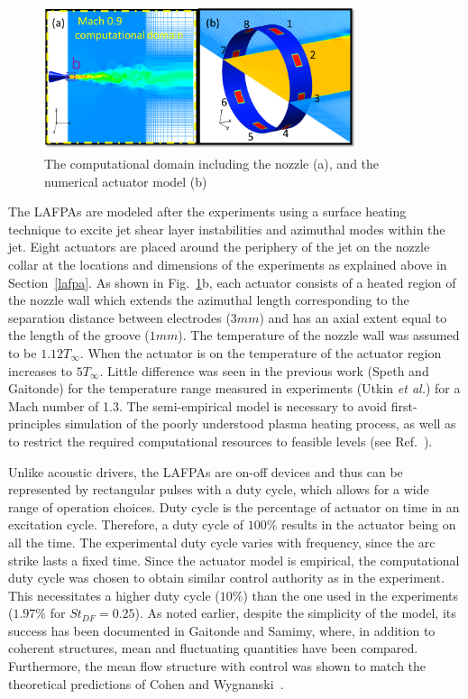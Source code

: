 \documentclass[english]{aiaa-tc}
\begin{document}
\begin{figure}[h]
\begin{center}
\includegraphics[width=3.6in]{actuatormodelnew}
\caption{The computational domain including the nozzle  (a), and the numerical actuator model (b)}\label{fig:actuator}
\end{center}
\end{figure}
The LAFPAs are modeled after the experiments using a surface heating
technique to excite jet shear layer instabilities and azimuthal modes
within the jet.  Eight actuators are placed around the periphery of
the jet on the nozzle collar at the locations and dimensions of the
experiments as explained above in Section~\ref{lafpa}. As shown in
Fig.~\ref{fig:actuator}b, each actuator consists of a heated region of
the nozzle wall which extends the azimuthal length corresponding to
the separation distance between electrodes ($3 mm$) and has an axial
extent equal to the length of the groove ($1 mm$). The temperature of
the nozzle wall was assumed to be $1.12T_{\infty}$.  When the actuator
is on the temperature of the actuator region increases to
$5T_{\infty}$. Little difference was seen in the previous work (Speth
and Gaitonde\cite{SpethASM2012}) for the temperature range measured in
experiments (Utkin {\em et al.}\cite{uyg2007-2}) for a Mach number of
1.3.  The semi-empirical model is necessary to avoid first-principles
simulation of the poorly understood plasma heating process, as well as
to restrict the required computational resources to feasible levels
(see Ref.~).

Unlike acoustic drivers, the LAFPAs are on-off devices and thus can be
represented by rectangular pulses with a duty cycle, which allows for
a wide range of operation choices.  Duty cycle is the percentage of
actuator on time in an excitation cycle. Therefore, a duty cycle
of $100\%$ results in the actuator being on all the time.  
The experimental duty cycle varies with frequency, since the arc
strike lasts a fixed time.  Since the actuator
model is empirical, the computational duty cycle was chosen to obtain
similar control authority as in the experiment.  This necessitates a
higher
duty cycle ($10\%$) than the one used in the experiments
($1.97\%$ for $St_{DF}=0.25$).
As noted earlier, despite the simplicity of the model, its success
has been documented in Gaitonde 
and Samimy\cite{gdv2011-POF}, where, in addition to coherent
structures, mean and fluctuating quantities have been compared.
Furthermore, the mean flow structure with control was shown to match
the theoretical predictions of Cohen and Wygnanski~\cite{cj87-2}.
\end{document}
